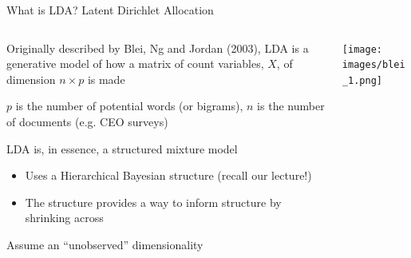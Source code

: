 \documentclass[notes,11pt, aspectratio=169]{beamer}
\newenvironment{wideitemize}{\itemize\addtolength{\itemsep}{10pt}}{\enditemize}
\begin{document}
  \begin{frame}{What is LDA? Latent Dirichlet Allocation}
    \begin{columns}[onlytextwidth, T] %
      \begin{column}{.5\textwidth}
        \begin{wideitemize}
        \item Originally described by Blei, Ng and Jordan (2003), LDA is a
          generative model of how a matrix of count variables, $X$, of
          dimension $n \times p$ is made
        \item $p$ is the number of potential words (or bigrams), $n$ is the
          number of documents (e.g. CEO surveys)
        \item LDA is, in essence, a structured mixture model
          \begin{itemize}
          \item Uses a Hierarchical Bayesian structure (recall our lecture!)
          \item The structure provides a way to inform structure by
            shrinking across
          \end{itemize}
        \item Assume an ``unobserved'' dimensionality 
        \end{wideitemize}
      \end{column}%
      \hfill%
      \begin{column}{.5\textwidth}
        \texttt{[image: images/blei\_1.png]}
      \end{column}%
    \end{columns}
  \end{frame}
\end{document}
